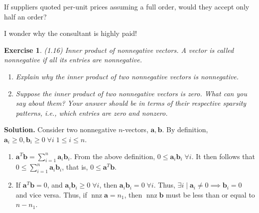 \documentclass[11pt]{book}
\theoremstyle{definition}
\theoremstyle{plain}
\newtheorem{exercise}{Exercise}[chapter]
\theoremstyle{problemstyle}
\theoremstyle{remark}
\theoremstyle{definition}
\DeclareMathOperator{\nnz}{nnz} %
\begin{document}
If suppliers quoted per-unit prices assuming a full order, would they accept only half an order?

I wonder why the consultant is highly paid!

\begin{exercise}
    (1.16) Inner product of nonnegative vectors. A vector is called nonnegative if all its entries are nonnegative.
\begin{enumerate}[label=(\alph*)]
    \item Explain why the inner product of two nonnegative vectors is nonnegative.
    \item Suppose the inner product of two nonnegative vectors is zero. What can you say about them? Your answer should be in terms of their respective sparsity patterns, i.e., which entries are zero and nonzero.
\end{enumerate}
\end{exercise}
\textbf{Solution.}
Consider two nonnegative $n$-vectors, $\boldsymbol{a,b}$. By definition, $\boldsymbol{a}_i\geq 0,\boldsymbol{b}_i\geq 0\;\forall i\; 1\leq i\leq n$.
\begin{enumerate}[label=(\alph*)]
    \item $\boldsymbol{a}^T\boldsymbol{b}=\sum_{i=1}^{n}\boldsymbol{a}_i\boldsymbol{b}_i$. From the above definition, $0\leq\boldsymbol{a}_i\boldsymbol{b}_i\;\forall i$. It then follows that $0\leq\sum_{i=1}^{n}\boldsymbol{a}_i\boldsymbol{b}_i$, that is, $0\leq\boldsymbol{a}^T\boldsymbol{b}$.
    \item If $\boldsymbol{a}^T\boldsymbol{b}=0$, and $\boldsymbol{a}_i\boldsymbol{b}_i\geq 0\;\forall i$, then $\boldsymbol{a}_i\boldsymbol{b}_i=0\;\forall i$. Thus, $\exists i\mid\boldsymbol{a}_i\ne 0\implies \boldsymbol{b}_i=0$ and vice versa. Thus, if $\nnz{\boldsymbol{a}}=n_1$, then $\nnz{\boldsymbol{b}}$ must be less than or equal to $n-n_1$.
\end{enumerate}
\end{document}
